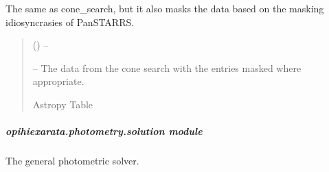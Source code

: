 \documentclass[letterpaper,11pt,english]{sphinxmanual}
\begin{document}
\begin{savenotes}
\begin{fulllineitems}

\begin{savenotes}\begin{fulllineitems}
\label{\detokenize{code/opihiexarata.photometry.panstarrs:opihiexarata.photometry.panstarrs.PanstarrsMastWebAPIEngine.masked_cone_search}}
\pysigstartsignatures
{}
\pysigstopsignatures
\sphinxAtStartPar
The same as cone\_search, but it also masks the data based on the
masking idiosyncrasies of PanSTARRS.
\begin{quote}\begin{description}
\sphinxAtStartPar
{}\sphinxstyleliteralstrong{\sphinxupquote{)}} (\sphinxstyleliteralemphasis{\sphinxupquote{(}}) – 

\sphinxAtStartPar
{} – The data from the cone search with the entries masked where
appropriate.

\sphinxAtStartPar
Astropy Table

\end{description}\end{quote}

\end{fulllineitems}\end{savenotes}


\end{fulllineitems}\end{savenotes}


\sphinxstepscope


\subparagraph{opihiexarata.photometry.solution module}
\label{\detokenize{code/opihiexarata.photometry.solution:module-opihiexarata.photometry.solution}}\label{\detokenize{code/opihiexarata.photometry.solution:opihiexarata-photometry-solution-module}}\label{\detokenize{code/opihiexarata.photometry.solution::doc}}
\sphinxAtStartPar
The general photometric solver.
\end{document}
